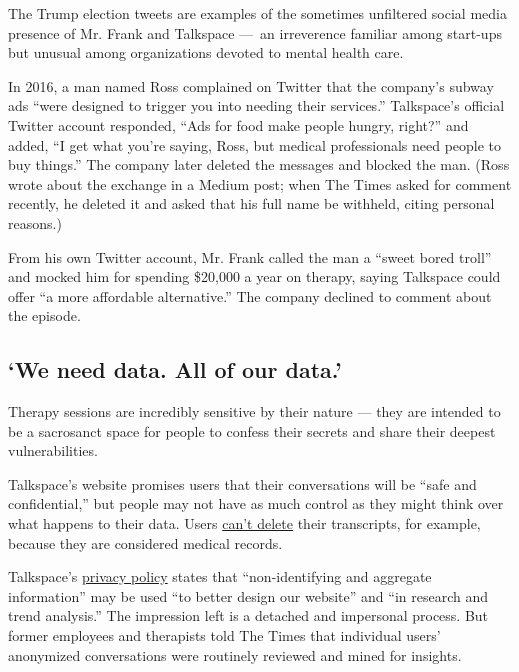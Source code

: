 The Trump election tweets are examples of the sometimes unfiltered
social media presence of Mr. Frank and Talkspace ---~an irreverence
familiar among start-ups but unusual among organizations devoted to
mental health care.

In 2016, a man named Ross complained on Twitter that the company's
subway ads ``were designed to trigger you into needing their services.''
Talkspace's official Twitter account responded, ``Ads for food make
people hungry, right?'' and added, ``I get what you're saying, Ross, but
medical professionals need people to buy things.'' The company later
deleted the messages and blocked the man. (Ross wrote about the exchange
in a Medium post; when The Times asked for comment recently, he deleted
it and asked that his full name be withheld, citing personal reasons.)

From his own Twitter account, Mr. Frank called the man a ``sweet bored
troll'' and mocked him for spending \$20,000 a year on therapy, saying
Talkspace could offer ``a more affordable alternative.'' The company
declined to comment about the episode.

\hypertarget{we-need-data-all-of-our-data}{%
\subsection{`We need data. All of our
data.'}\label{we-need-data-all-of-our-data}}

Therapy sessions are incredibly sensitive by their nature --- they are
intended to be a sacrosanct space for people to confess their secrets
and share their deepest vulnerabilities.

Talkspace's website promises users that their conversations will be
``safe and confidential,'' but people may not have as much control as
they might think over what happens to their data. Users
\href{https://help.talkspace.com/hc/en-us/articles/360000286663-Am-I-able-to-delete-my-chat-transcript-}{can't
delete} their transcripts, for example, because they are considered
medical records.

Talkspace's
\href{https://www.talkspace.com/public/privacy-policy}{privacy policy}
states that ``non-identifying and aggregate information'' may be used
``to better design our website'' and ``in research and trend analysis.''
The impression left is a detached and impersonal process. But former
employees and therapists told The Times that individual users'
anonymized conversations were routinely reviewed and mined for insights.


